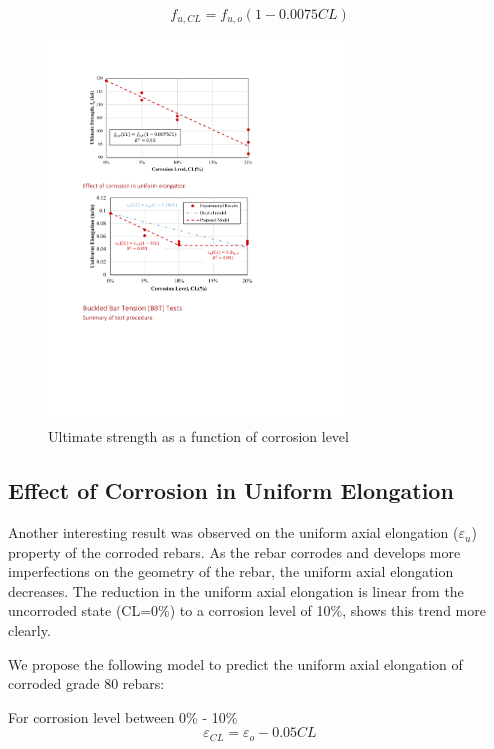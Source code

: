\begin{equation}
    f_{u,CL} = f_{u,o}(1-0.0075CL)
    \label{eq.Calderon_Fu_vs_CL}
\end{equation}

\begin{figure}[htbp]
	\centering
	\includegraphics[width=0.7\textwidth]{VAC Thesis 2.0/Chapter-4/figs/TensionTest_results_5_UltimateStrength.pdf}
	\caption{Ultimate strength as a function of corrosion level}
	\label{fig:Calderon_ultimate_strength}
\end{figure}

\subsection{Effect of Corrosion in Uniform Elongation}

Another interesting result was observed on the uniform axial elongation ($\varepsilon_{u}$) property of the corroded rebars. As the rebar corrodes and develops more imperfections on the geometry of the rebar, the uniform axial elongation decreases. The reduction in the uniform axial elongation is linear from the uncorroded state  (CL=0\%) to a corrosion level of 10\%,  shows this trend more clearly. 

We propose the following model to predict the uniform axial elongation of corroded grade 80 rebars:

For corrosion level between 0\% - 10\%
\begin{equation}
    \varepsilon_{CL} = \varepsilon_{o}-0.05CL
    \label{eq.Calderon_UAE_vs_CL}
\end{equation}

